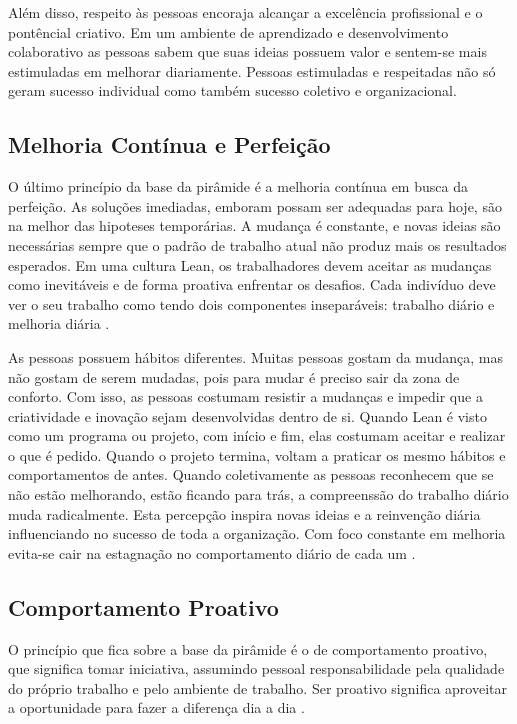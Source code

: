 \begin{anexosenv}
Além disso, respeito às pessoas encoraja alcançar a excelência profissional e o pontêncial criativo. Em um ambiente de aprendizado e desenvolvimento colaborativo as pessoas sabem que suas ideias possuem valor e sentem-se mais estimuladas em melhorar diariamente. Pessoas estimuladas e respeitadas não só geram sucesso individual como também sucesso coletivo e organizacional.


\subsection[Melhoria Contínua e Perfeição]{Melhoria Contínua e Perfeição}

O último princípio da base da pirâmide é a melhoria contínua em busca da perfeição.  As soluções imediadas, emboram possam ser adequadas para hoje, são na melhor das hipoteses temporárias.  A mudança é constante, e novas ideias são necessárias  sempre que o padrão de trabalho atual não produz mais os resultados esperados. Em uma cultura Lean, os trabalhadores devem aceitar as mudanças como inevitáveis e de forma proativa enfrentar os desafios. Cada indivíduo deve ver o seu trabalho como tendo dois componentes inseparáveis: trabalho diário e melhoria diária \cite{bell2011}.

As pessoas possuem hábitos diferentes. Muitas pessoas gostam da mudança, mas não gostam de serem mudadas, pois para mudar é preciso sair da zona de conforto.  Com isso, as pessoas costumam resistir a mudanças e impedir que a criatividade e inovação sejam desenvolvidas dentro de si.  Quando Lean é visto como um programa ou projeto, com início e fim, elas costumam aceitar e realizar o que é pedido. Quando o projeto termina, voltam a praticar os mesmo hábitos e comportamentos de antes. Quando coletivamente as pessoas reconhecem que se não estão melhorando, estão ficando para trás, a compreenssão do trabalho diário muda radicalmente. Esta percepção inspira novas ideias e a reinvenção diária influenciando no sucesso de toda a organização. Com foco constante em melhoria evita-se cair na estagnação no comportamento diário de cada um  \cite{bell2011}.


\subsection[Comportamento Proativo]{Comportamento Proativo}

O princípio que fica sobre a base da pirâmide é o de comportamento proativo, que significa tomar iniciativa, assumindo pessoal responsabilidade pela qualidade do próprio trabalho e pelo ambiente de trabalho. Ser proativo significa aproveitar a oportunidade para fazer a diferença dia a dia \cite{bell2011}.


\end{anexosenv}
